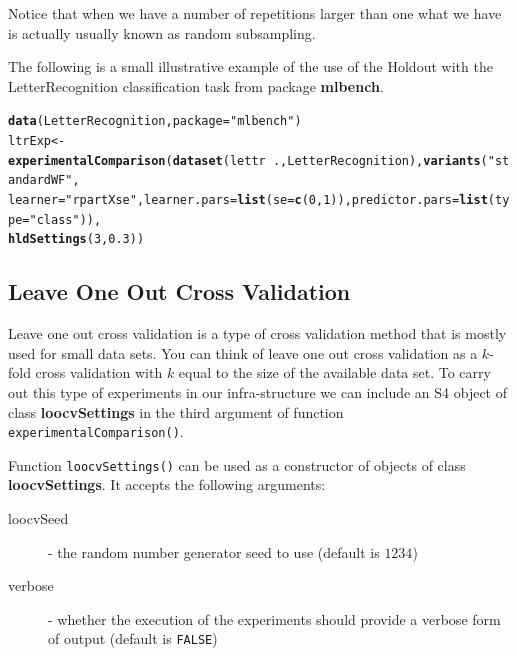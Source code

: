 \documentclass[10pt,a4paper]{article}\usepackage[]{graphicx}\usepackage[]{color}
\makeatletter
\newcommand{\hlnum}[1]{\textcolor[rgb]{0.686,0.059,0.569}{#1}}%
\newcommand{\hlstr}[1]{\textcolor[rgb]{0.192,0.494,0.8}{#1}}%
\newcommand{\hlopt}[1]{\textcolor[rgb]{0,0,0}{#1}}%
\newcommand{\hlstd}[1]{\textcolor[rgb]{0.345,0.345,0.345}{#1}}%
\newcommand{\hlkwb}[1]{\textcolor[rgb]{0.69,0.353,0.396}{#1}}%
\newcommand{\hlkwc}[1]{\textcolor[rgb]{0.333,0.667,0.333}{#1}}%
\newcommand{\hlkwd}[1]{\textcolor[rgb]{0.737,0.353,0.396}{\textbf{#1}}}%
\newenvironment{kframe}{%
 \def\at@end@of@kframe{}%
 \ifinner\ifhmode%
  \def\at@end@of@kframe{\end{minipage}}%
  \begin{minipage}{\columnwidth}%
 \fi\fi%
 \def\FrameCommand##1{\hskip\@totalleftmargin \hskip-\fboxsep
 \colorbox{shadecolor}{##1}\hskip-\fboxsep
     \hskip-\linewidth \hskip-\@totalleftmargin \hskip\columnwidth}%
 \MakeFramed {\advance\hsize-\width
   \@totalleftmargin\z@ \linewidth\hsize
   \@setminipage}}%
 {\par\unskip\endMakeFramed%
 \at@end@of@kframe}
\newenvironment{knitrout}{}{} %
\makeatother
\begin{document}
Notice that when we have a number of repetitions larger than one what
we have is actually usually known as random subsampling.

The following is a small illustrative example of the use of the
Holdout with the LetterRecognition classification task from package
\textbf{mlbench}.

\begin{knitrout}
\color{fgcolor}\begin{kframe}
\begin{alltt}
\hlkwd{data}\hlstd{(LetterRecognition,} \hlkwc{package} \hlstd{=} \hlstr{"mlbench"}\hlstd{)}
\hlstd{ltrExp} \hlkwb{<-} \hlkwd{experimentalComparison}\hlstd{(}\hlkwd{dataset}\hlstd{(lettr} \hlopt{~} \hlstd{., LetterRecognition),} \hlkwd{variants}\hlstd{(}\hlstr{"standardWF"}\hlstd{,}
    \hlkwc{learner} \hlstd{=} \hlstr{"rpartXse"}\hlstd{,} \hlkwc{learner.pars} \hlstd{=} \hlkwd{list}\hlstd{(}\hlkwc{se} \hlstd{=} \hlkwd{c}\hlstd{(}\hlnum{0}\hlstd{,} \hlnum{1}\hlstd{)),} \hlkwc{predictor.pars} \hlstd{=} \hlkwd{list}\hlstd{(}\hlkwc{type} \hlstd{=} \hlstr{"class"}\hlstd{)),}
    \hlkwd{hldSettings}\hlstd{(}\hlnum{3}\hlstd{,} \hlnum{0.3}\hlstd{))}
\end{alltt}
\end{kframe}
\end{knitrout}


\subsection{Leave One Out Cross Validation}

Leave one out cross validation is a type of cross validation method
that is mostly used for small data sets. You can think of leave one
out cross validation as a $k$-fold cross validation with $k$ equal to
the size of the available data set. To carry out this type of
experiments in our infra-structure we can include an S4 object of
class \textbf{loocvSettings} in the third argument of function
\texttt{experimentalComparison()}.

Function \texttt{loocvSettings()} can be used as a constructor of
objects of class \textbf{loocvSettings}. It accepts the following
arguments:

\begin{description}
\item[loocvSeed] - the random number generator seed to use (default is $1234$)
\item[verbose] - whether the execution of the experiments should provide a verbose form of output (default is \texttt{FALSE})
\end{description}
\end{document}
